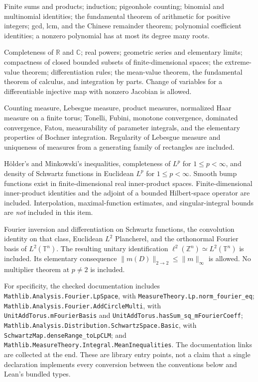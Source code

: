\documentclass[11pt,oneside]{article}
\theoremstyle{definition}\newtheorem{definition}[theorem]{Definition}
\theoremstyle{remark}\newtheorem{remark}[theorem]{Remark}
\newcommand{\R}{\mathbb R}\newcommand{\Z}{\mathbb Z}\newcommand{\N}{\mathbb N}\newcommand{\Q}{\mathbb Q}\newcommand{\C}{\mathbb C}\newcommand{\T}{\mathbb T}
\newcommand{\ml}[1]{{\normalfont\small\nolinkurl{#1}}}
\begin{document}
\begin{description}[style=nextline]
\item[F1. Algebra and finite combinatorics.]
Finite sums and products; induction; pigeonhole counting; binomial and
multinomial identities; the fundamental theorem of arithmetic for positive
integers; gcd, lcm, and the Chinese remainder theorem; polynomial coefficient
identities; a nonzero polynomial has at most its degree many roots.
\item[F2. Scalar and finite-dimensional analysis.]
Completeness of $\R$ and $\C$; real powers; geometric series and elementary
limits; compactness of closed bounded subsets of finite-dimensional spaces;
the extreme-value theorem; differentiation rules; the mean-value theorem,
the fundamental theorem of calculus,
and integration by parts. Change of variables for a differentiable injective
map with nonzero Jacobian is allowed.
\item[F3. Measure and integration.]
Counting measure, Lebesgue measure, product measures, normalized Haar measure
on a finite torus; Tonelli, Fubini, monotone convergence, dominated convergence,
Fatou, measurability of parameter integrals, and the elementary properties of
Bochner integration. Regularity of Lebesgue measure and uniqueness of measures
from a generating family of rectangles are included.
\item[F4. Norms and approximation.]
H\"older's and Minkowski's inequalities, completeness of $L^p$ for $1\leq p<\infty$,
and density of Schwartz functions in Euclidean $L^p$ for $1\leq p<\infty$. Smooth bump functions
exist in finite-dimensional real inner-product spaces. Finite-dimensional
inner-product identities and the adjoint of a bounded Hilbert-space operator
are included. Interpolation, maximal-function estimates, and singular-integral
bounds are \emph{not} included in this item.
\item[F5. Fourier analysis at the library boundary.]
Fourier inversion and differentiation on Schwartz functions, the convolution
identity on that class, Euclidean $L^2$ Plancherel, and the orthonormal Fourier
basis of $L^2(\T^n)$. The resulting unitary identification
$\ell^2(\Z^n)\simeq L^2(\T^n)$ is included. Its elementary consequence
$\|m(D)\|_{2\to2}\leq\|m\|_\infty$ is allowed. No multiplier theorem at
$p\ne2$ is included.
\end{description}

For specificity, the checked documentation includes
\ml{Mathlib.Analysis.Fourier.LpSpace}, with
\ml{MeasureTheory.Lp.norm_fourier_eq};
\ml{Mathlib.Analysis.Fourier.AddCircleMulti}, with
\ml{UnitAddTorus.mFourierBasis} and
\ml{UnitAddTorus.hasSum_sq_mFourierCoeff};
\ml{Mathlib.Analysis.Distribution.SchwartzSpace.Basic}, with
\ml{SchwartzMap.denseRange_toLpCLM}; and
\ml{Mathlib.MeasureTheory.Integral.MeanInequalities}.
The documentation links are collected at the end. These are library entry
points, not a claim that a single declaration implements every conversion
between the conventions below and Lean's bundled types.
\end{document}
